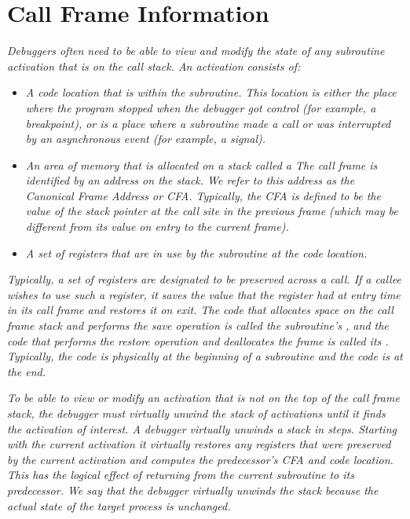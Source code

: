 \section{Call Frame Information}
\label{chap:callframeinformation}

\textit{Debuggers often need to be able to view and modify the 
state of any subroutine activation that is
on the call stack. An activation consists of:}

\begin{itemize}
\item \textit{A code location that is within the
subroutine. This location is either the place where the program
stopped when the debugger got control (for example, a breakpoint), or
is a place where a subroutine made a call or was interrupted
by an asynchronous event (for example, a signal).}

\item \textit{An area of memory that is allocated on a stack called a
 The call frame is identified by an address
on the stack. We refer to this address as the Canonical
Frame Address or CFA. Typically, the CFA is defined to be the
value of the stack pointer at the call site in the previous
frame (which may be different from its value on entry to the
current frame).}

\item \textit{A set of registers that are in use by the subroutine
at the code location.}

\end{itemize}

\textit{Typically, a set of registers are designated to be preserved
across a call. If a callee wishes to use such a register, it
saves the value that the register had at entry time in its call
frame and restores it on exit. The code that allocates space
on the call frame stack and performs the save operation is
called the subroutine\textquoteright{s} , and the code that performs
the restore operation and deallocates the frame is called its
. Typically, the 
 code is physically at the
beginning of a subroutine and the 
 code is at the end.}

\textit{To be able to view or modify an activation that is not
on the top of the call frame stack, the debugger must
virtually unwind the stack of activations until
it finds the activation of interest.  A debugger virtually unwinds
a stack in steps. Starting with the current activation it
virtually restores any registers that were preserved by the
current activation and computes the predecessor\textquoteright{s} CFA and
code location. This has the logical effect of returning from
the current subroutine to its predecessor. We say that the
debugger virtually unwinds the stack because the actual state
of the target process is unchanged.}

